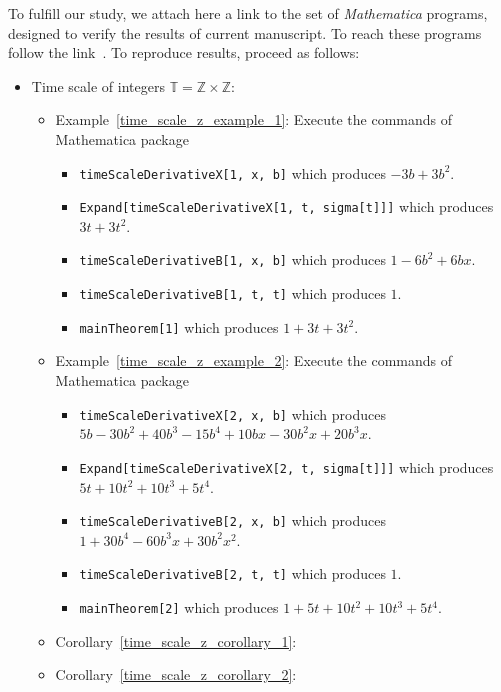 To fulfill our study, we attach here a link to the set of \emph{Mathematica} programs, designed to verify the results of current manuscript.
To reach these programs follow the link~\cite{kolosov2022mathematica}.
To reproduce results, proceed as follows:
\begin{itemize}
    \setlength\itemsep{1em}
    \item Time scale of integers $\mathbb{T} = \mathbb{Z} \times \mathbb{Z}$:
    \begin{itemize}
        \setlength\itemsep{0.5em}
        \item Example~\ref{time_scale_z_example_1}:
        Execute the commands of Mathematica package
        \begin{itemize}
            \item \texttt{timeScaleDerivativeX[1, x, b]} which produces $-3 b + 3 b^2$.
            \item \texttt{Expand[timeScaleDerivativeX[1, t, sigma[t]]]} which produces $3 t + 3 t^2$.
            \item \texttt{timeScaleDerivativeB[1, x, b]} which produces $1 - 6 b^2 + 6 b x$.
            \item \texttt{timeScaleDerivativeB[1, t, t]} which produces $1$.
            \item \texttt{mainTheorem[1]} which produces $1 + 3 t + 3 t^2$.
        \end{itemize}
        \item Example~\ref{time_scale_z_example_2}:
        Execute the commands of Mathematica package
        \begin{itemize}
            \item \texttt{timeScaleDerivativeX[2, x, b]} which produces
            $5 b - 30 b^2 + 40 b^3 - 15 b^4 + 10 b x - 30 b^2 x + 20 b^3 x$.
            \item \texttt{Expand[timeScaleDerivativeX[2, t, sigma[t]]]} which produces $5 t + 10 t^2 + 10 t^3 + 5 t^4$.
            \item \texttt{timeScaleDerivativeB[2, x, b]} which produces $1 + 30 b^4 - 60 b^3 x + 30 b^2 x^2$.
            \item \texttt{timeScaleDerivativeB[2, t, t]} which produces $1$.
            \item \texttt{mainTheorem[2]} which produces $1 + 5 t + 10 t^2 + 10 t^3 + 5 t^4$.
        \end{itemize}
        \item Corollary~\ref{time_scale_z_corollary_1}:
        \item Corollary~\ref{time_scale_z_corollary_2}:

\end{itemize}
\end{itemize}

